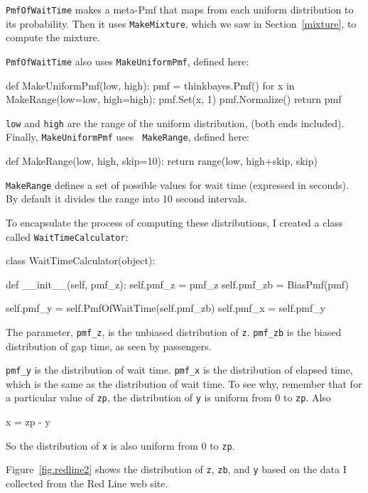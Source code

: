 \documentclass[12pt]{book}
\theoremstyle{exercise}
\begin{document}
{\tt PmfOfWaitTime} makes a meta-Pmf that maps from each uniform
distribution to its probability.  Then it uses {\tt MakeMixture},
which we saw in Section~\ref{mixture}, to compute the mixture.

{\tt PmfOfWaitTime} also uses {\tt MakeUniformPmf}, defined here:

\begin{code}
def MakeUniformPmf(low, high):
    pmf = thinkbayes.Pmf()
    for x in MakeRange(low=low, high=high):
        pmf.Set(x, 1)
    pmf.Normalize()
    return pmf
\end{code}

{\tt low} and {\tt high} are the range of the uniform distribution,
(both ends included).  Finally, {\tt MakeUniformPmf} uses {\tt
  MakeRange}, defined here:

\begin{code}
def MakeRange(low, high, skip=10):
    return range(low, high+skip, skip)
\end{code}

{\tt MakeRange} defines a set of possible values for wait time
(expressed in seconds).  By default it divides the range into 
10 second intervals.

To encapsulate the process of computing these distributions, I
created a class called {\tt WaitTimeCalculator}:

\begin{code}
class WaitTimeCalculator(object):

    def __init__(self, pmf_z):
        self.pmf_z = pmf_z
        self.pmf_zb = BiasPmf(pmf)

        self.pmf_y = self.PmfOfWaitTime(self.pmf_zb)
        self.pmf_x = self.pmf_y
\end{code}

The parameter, \verb"pmf_z", is the unbiased distribution of {\tt z}.
\verb"pmf_zb" is the biased distribution of gap time, as seen by
passengers.

\verb"pmf_y" is the distribution of wait time.  \verb"pmf_x" is the
distribution of elapsed time, which is the same as the distribution of
wait time.  To see why, remember that for a particular value of
{\tt zp}, the distribution of {\tt y} is uniform from 0 to {\tt zp}.
Also
%
\begin{code}
x = zp - y
\end{code}
%
So the distribution of {\tt x} is also uniform from 0 to {\tt zp}.

Figure~\ref{fig.redline2} shows the distribution of {\tt z}, {\tt zb},
and {\tt y} based on the data I collected from the Red Line web site.
\end{document}
